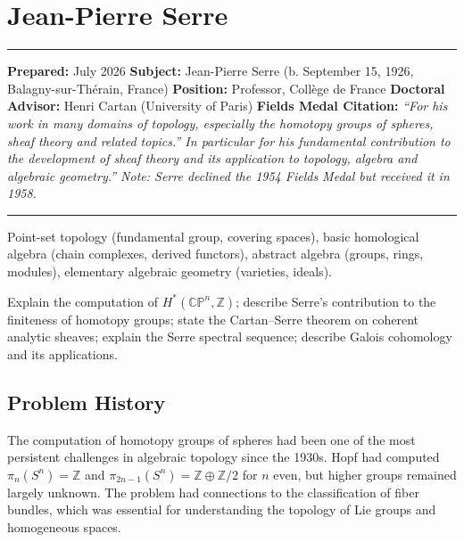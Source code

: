\chapter{Jean-Pierre Serre}\label{ch1954jeanpierreserre:jean-pierre-serre-fields-medal-1954-a-comprehensive-report}

\begin{center}\rule{0.5\linewidth}{0.5pt}\end{center}

\textbf{Prepared:} July 2026 \textbf{Subject:} Jean-Pierre Serre (b. September 15,
1926, Balagny-sur-Thérain, France) \textbf{Position:} Professor, Collège de France
\textbf{Doctoral Advisor:} Henri Cartan (University of Paris)
\textbf{Fields Medal Citation:} \emph{``For his work in many domains of topology,
especially the homotopy groups of spheres, sheaf theory and related topics.''
In particular for his fundamental contribution to the development of sheaf theory
and its application to topology, algebra and algebraic geometry.''
Note: Serre declined the 1954 Fields Medal but received it in 1958.}

\begin{center}\rule{0.5\linewidth}{0.5pt}\end{center}

\begin{prereqs} Point-set topology (fundamental group, covering spaces), basic homological algebra (chain complexes, derived functors), abstract algebra (groups, rings, modules), elementary algebraic geometry (varieties, ideals). \end{prereqs}

\begin{objectives} Explain the computation of $H^*(\mathbb{CP}^n, \mathbb{Z})$; describe Serre's contribution to the finiteness of homotopy groups; state the Cartan--Serre theorem on coherent analytic sheaves; explain the Serre spectral sequence; describe Galois cohomology and its applications. \end{objectives}

\section{Problem History}

The computation of homotopy groups of spheres had been one of the most persistent challenges in algebraic topology since the 1930s. Hopf had computed $\pi_n(S^n) = \mathbb{Z}$ and $\pi_{2n-1}(S^n) = \mathbb{Z} \oplus \mathbb{Z}/2$ for $n$ even, but higher groups remained largely unknown. The problem had connections to the classification of fiber bundles, which was essential for understanding the topology of Lie groups and homogeneous spaces.

